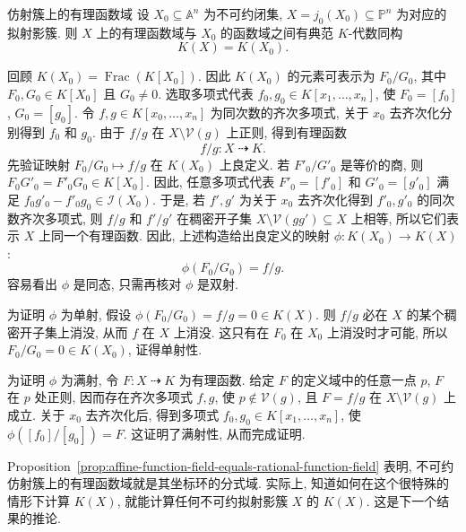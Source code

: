\begin{Proposition}{仿射簇上的有理函数域}\leavevmode\label{prop:affine-function-field-equals-rational-function-field}
设 $X_{0}\subseteq\mathbb{A}^{n}$ 为不可约闭集, $X=j_{0}(X_{0})\subseteq\mathbb{P}^{n}$ 为对应的拟射影簇. 则 $X$ 上的有理函数域与 $X_{0}$ 的函数域之间有典范 $K$-代数同构
\[
  K(X)=K(X_{0}).
\]
\end{Proposition}
\begin{Proof}
回顾 $K(X_{0})=\operatorname{Frac}(K[X_{0}])$. 因此 $K(X_{0})$ 的元素可表示为 $F_{0}/G_{0}$, 其中 $F_{0},G_{0}\in K[X_{0}]$ 且 $G_{0}\ne0$. 选取多项式代表 $f_{0},g_{0}\in K[x_{1},\ldots,x_{n}]$, 使 $F_{0}=[f_{0}]$, $G_{0}=[g_{0}]$. 令 $f,g\in K[x_{0},\ldots,x_{n}]$ 为同次数的齐次多项式, 关于 $x_{0}$ 去齐次化分别得到 $f_{0}$ 和 $g_{0}$. 由于 $f/g$ 在 $X\setminus\mathcal{V}(g)$ 上正则, 得到有理函数
\[
  f/g:X\mathrel{\rightdasharrow} K.
\]
先验证映射 $F_{0}/G_{0}\mapsto f/g$ 在 $K(X_{0})$ 上良定义. 若 $F'_{0}/G'_{0}$ 是等价的商, 则 $F_{0}G'_{0}=F'_{0}G_{0}\in K[X_{0}]$. 因此, 任意多项式代表 $F'_{0}=[f'_{0}]$ 和 $G'_{0}=[g'_{0}]$ 满足 $f_{0}g'_{0}-f'_{0}g_{0}\in\mathcal{I}(X_{0})$. 于是, 若 $f',g'$ 为关于 $x_{0}$ 去齐次化得到 $f'_{0},g'_{0}$ 的同次数齐次多项式, 则 $f/g$ 和 $f'/g'$ 在稠密开子集 $X\setminus\mathcal{V}(gg')\subseteq X$ 上相等, 所以它们表示 $X$ 上同一个有理函数. 因此, 上述构造给出良定义的映射 $\phi:K(X_{0})\to K(X)$:
\[
  \phi(F_{0}/G_{0})=f/g.
\]
容易看出 $\phi$ 是同态, 只需再核对 $\phi$ 是双射.

为证明 $\phi$ 为单射, 假设 $\phi(F_{0}/G_{0})=f/g=0\in K(X)$. 则 $f/g$ 必在 $X$ 的某个稠密开子集上消没, 从而 $f$ 在 $X$ 上消没. 这只有在 $F_{0}$ 在 $X_{0}$ 上消没时才可能, 所以 $F_{0}/G_{0}=0\in K(X_{0})$, 证得单射性.

为证明 $\phi$ 为满射, 令 $F:X\mathrel{\rightdasharrow} K$ 为有理函数. 给定 $F$ 的定义域中的任意一点 $p$, $F$ 在 $p$ 处正则, 因而存在齐次多项式 $f,g$, 使 $p\notin\mathcal{V}(g)$, 且 $F=f/g$ 在 $X\setminus\mathcal{V}(g)$ 上成立. 关于 $x_{0}$ 去齐次化后, 得到多项式 $f_{0},g_{0}\in K[x_{1},\ldots,x_{n}]$, 使 $\phi([f_{0}]/[g_{0}])=F$. 这证明了满射性, 从而完成证明.
\end{Proof}

Proposition~\ref{prop:affine-function-field-equals-rational-function-field} 表明, 不可约仿射簇上的有理函数域就是其坐标环的分式域. 实际上, 知道如何在这个很特殊的情形下计算 $K(X)$, 就能计算任何不可约拟射影簇 $X$ 的 $K(X)$. 这是下一个结果的推论.

